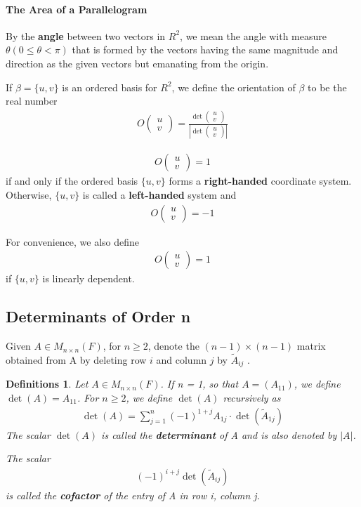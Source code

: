 \documentclass{article}
\newcommand{\bd}[1]{\textbf{#1}}
\newcommand*\bpmat[0]{\begin{pmatrix}}
\newcommand*\epmat[0]{\end{pmatrix}}
\theoremstyle{plain}
\newtheorem*{definitions}{Definitions}
\theoremstyle{plain} %
\begin{document}
\paragraph{The Area of a Parallelogram}

By the \bd{angle} between two vectors in $R^2$, we mean the angle with measure $\theta (0 \leq \theta < \pi)$ that is formed by the vectors having the same magnitude and direction as the given vectors but emanating from the origin.

If $\beta = \{u, v\}$ is an ordered basis for $R^2$, we define the orientation of $\beta$ to be the real number
\begin{align*}
  O\bpmat u\\v\epmat = \frac{\det\bpmat u\\v\epmat}{\left\lvert \det\bpmat u\\v\epmat\right\rvert}
\end{align*}

\begin{align*}
  O\bpmat u\\v\epmat =1
\end{align*}
if and only if the ordered basis $\{u, v\}$ forms a \bd{right-handed} coordinate system. Otherwise, $\{u, v\}$ is called a \bd{left-handed} system and
\begin{align*}
  O\bpmat u\\v\epmat = -1
\end{align*}

For convenience, we also define
\begin{align*}
  O\bpmat u\\v\epmat =1
\end{align*}
if $\{u, v\}$ is linearly dependent.


\subsection{Determinants of Order n}

Given $A \in M_{n\times n}(F)$, for $n \geq 2$, denote the $(n−1)\times (n−1)$ matrix obtained from A by deleting row $i$ and column $j$ by $\tilde{A}_{ij}$ . 

\begin{definitions}
  Let $A \in M_{n\times n}(F)$. If n = 1, so that $A = (A_{11})$, we define $\det(A) = A_{11}$. For $n \geq 2$, we define $\det(A)$ recursively as
  \begin{align*}
    \det(A) = \sum_{j=1}^n {(-1)}^{1+j}A_{1j}\cdot \det(\tilde{A}_{1j})
  \end{align*}
  The scalar $\det(A)$ is called the \bd{determinant} of A and is also denoted by $|A|$.

  The scalar
  \begin{align*}
    {(−1)}^{i+j} \det(\tilde{A}_{ij})
  \end{align*}
  is called the \bd{cofactor} of the entry of A in row i, column j.
\end{definitions}
\end{document}
